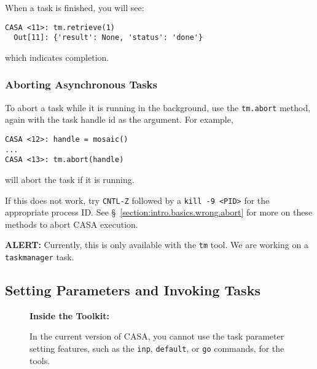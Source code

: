 When a task is finished, you will see:
\small
\begin{verbatim}
CASA <11>: tm.retrieve(1)
  Out[11]: {'result': None, 'status': 'done'}
\end{verbatim}
\normalsize
which indicates completion.

\subsubsection{Aborting Asynchronous Tasks}
\label{section:intro.tasks.async.abort}

To abort a task while it is running in the background, use the
{\tt tm.abort} method, again with the task handle id as the
argument.  For example,
\small
\begin{verbatim}
CASA <12>: handle = mosaic()
...
CASA <13>: tm.abort(handle)
\end{verbatim}
\normalsize
will abort the task if it is running.

If this does not work,
try {\tt CNTL-Z} followed by a {\tt kill -9 <PID>} for the appropriate
process ID.
See \S~\ref{section:intro.basics.wrong.abort} for more on these
methods to abort CASA execution.

{\bf ALERT:} Currently, this is only available with the 
{\tt tm} tool.  We are working on a {\tt taskmanager} task.

\subsection{Setting Parameters and Invoking Tasks}
\label{section:intro.tasks.setpar}

\begin{wrapfigure}{r}{2.5in}
  \begin{boxedminipage}{2.5in}
     \centerline{\bf Inside the Toolkit:}
     In the current version of CASA, you cannot use the
     task parameter setting features, such as the {\tt inp},
     {\tt default}, or {\tt go} commands, for the tools.
  \end{boxedminipage}
\end{wrapfigure}

